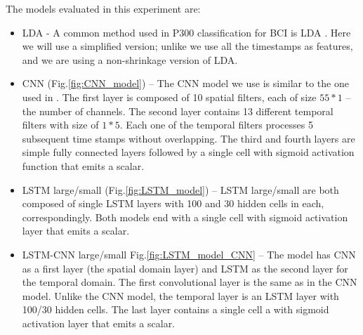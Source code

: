 \documentclass[
12pt, %
english, %
doublespacing, %
headsepline, %
]{MastersDoctoralThesis} %
\begin{document}
The models evaluated in this experiment are:
\begin{itemize}
	\item LDA - A common method used in P300 classification for BCI is LDA \cite{BlaknertzExperiment,P300_Tutorial}. Here we will use a simplified version; unlike \cite{BlaknertzExperiment} we use all the timestamps as features, and we are using a non-shrinkage version of LDA.
	
	\item CNN (Fig.\ref{fig:CNN_model}) -- The CNN model we use is similar to the one used in \cite{P300_CNN}. The first layer is composed of 10  spatial filters, each of size $55*1$ -- the number of channels. The second layer contains 13 different temporal filters with size of $1*5$. Each one of the temporal filters processes 5 subsequent time stamps without overlapping. The third and fourth layers are simple fully connected layers followed by a single cell with sigmoid activation function that emits a scalar.
	
	\item LSTM large/small (Fig.\ref{fig:LSTM_model}) -- LSTM large/small are both composed of single LSTM layers with 100 and 30 hidden cells in each, correspondingly. Both models end with a single cell with sigmoid activation layer that emits a scalar.
	
	\item LSTM-CNN large/small Fig.\ref{fig:LSTM_model_CNN} -- The model has CNN as a first layer (the spatial domain layer) and LSTM as the second layer for the temporal domain. The first convolutional layer is the same as in the CNN model. Unlike the CNN model, the temporal layer is an LSTM layer with 100/30 hidden cells. The last layer contains a single cell a with sigmoid activation layer that emits a scalar.

\end{itemize}
\end{document}
